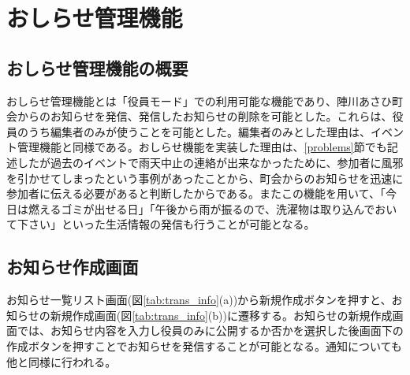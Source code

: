 \section{おしらせ管理機能}%
\subsection{おしらせ管理機能の概要}%
おしらせ管理機能とは「役員モード」での利用可能な機能であり、陣川あさひ町会からのお知らせを発信、発信したお知らせの削除を可能とした。これらは、役員のうち編集者のみが使うことを可能とした。編集者のみとした理由は、イベント管理機能と同様である。おしらせ機能を実装した理由は、\ref{problems}節でも記述したが過去のイベントで雨天中止の連絡が出来なかったために、参加者に風邪を引かせてしまったという事例があったことから、町会からのお知らせを迅速に参加者に伝える必要があると判断したからである。またこの機能を用いて、「今日は燃えるゴミが出せる日」「午後から雨が振るので、洗濯物は取り込んでおいて下さい」といった生活情報の発信も行うことが可能となる。


\subsection{お知らせ作成画面}%
お知らせ一覧リスト画面(図\ref{tab:trans_info}(a))から新規作成ボタンを押すと、お知らせの新規作成画面(図\ref{tab:trans_info}(b))に遷移する。お知らせの新規作成画面では、お知らせ内容を入力し役員のみに公開するか否かを選択した後画面下の作成ボタンを押すことでお知らせを発信することが可能となる。通知についても他と同様に行われる。

